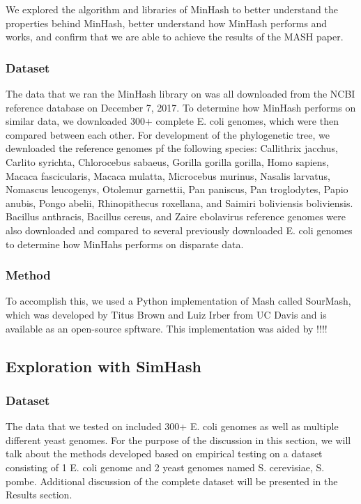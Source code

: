 \documentclass[12pt, letterpaper]{article}
\begin{document}
We explored the algorithm and libraries of MinHash to better understand the properties behind MinHash, better understand how MinHash performs and works, and confirm that we are able to achieve the results of the MASH paper.

\subsubsection{Dataset}
The data that we ran the MinHash library on was all downloaded from the NCBI reference database on December 7, 2017. To determine how MinHash performs on similar data, we downloaded 300+ complete E. coli genomes, which were then compared between each other. For development of the phylogenetic tree, we dewnloaded the reference genomes pf the following species: Callithrix jacchus, Carlito syrichta, Chlorocebus sabaeus, Gorilla gorilla gorilla, Homo sapiens, Macaca fascicularis, Macaca mulatta, Microcebus murinus, Nasalis larvatus, Nomascus leucogenys, Otolemur garnettii, Pan paniscus, Pan troglodytes, Papio anubis, Pongo abelii, Rhinopithecus roxellana, and Saimiri boliviensis boliviensis. Bacillus anthracis, Bacillus cereus, and Zaire ebolavirus reference genomes were also downloaded and compared to several previously downloaded E. coli genomes to determine how MinHahs performs on disparate data.

\subsubsection{Method}
To accomplish this, we used a Python implementation of Mash called SourMash, which was developed by Titus Brown and Luiz Irber from UC Davis and is available as an open-source spftware.\cite{GitHub-SourMash} This implementation was aided by !!!!

\subsection{Exploration with SimHash}
\subsubsection{Dataset}
The data that we tested on included 300+ E. coli genomes as well as multiple different yeast genomes. For the purpose of the discussion in this section, we will talk about the methods developed based on empirical testing on a dataset consisting of 1 E. coli genome and 2 yeast genomes named S. cerevisiae, S. pombe. Additional discussion of the complete dataset will be presented in the Results section.
\end{document}
